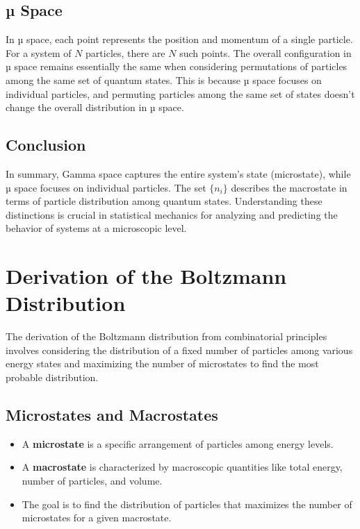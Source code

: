\documentclass[12pt]{article}
\begin{document}
\subsection{µ Space}
In µ space, each point represents the position and momentum of a single particle. For a system of \(N\) particles, there are \(N\) such points. The overall configuration in µ space remains essentially the same when considering permutations of particles among the same set of quantum states. This is because µ space focuses on individual particles, and permuting particles among the same set of states doesn't change the overall distribution in µ space.

\subsection{Conclusion}
In summary, Gamma space captures the entire system's state (microstate), while µ space focuses on individual particles. The set \(\{n_i\}\) describes the macrostate in terms of particle distribution among quantum states. Understanding these distinctions is crucial in statistical mechanics for analyzing and predicting the behavior of systems at a microscopic level.

\section{Derivation of the Boltzmann Distribution}

The derivation of the Boltzmann distribution from combinatorial principles involves considering the distribution of a fixed number of particles among various energy states and maximizing the number of microstates to find the most probable distribution.

\subsection{Microstates and Macrostates}
\begin{itemize}
    \item A \textbf{microstate} is a specific arrangement of particles among energy levels.
    \item A \textbf{macrostate} is characterized by macroscopic quantities like total energy, number of particles, and volume.
    \item The goal is to find the distribution of particles that maximizes the number of microstates for a given macrostate.
\end{itemize}
\end{document}
